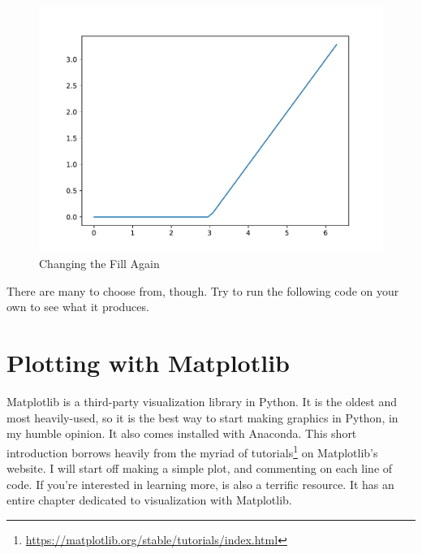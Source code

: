 \documentclass[
  12pt,
  krantz2]{krantz}
\makeatletter
\newenvironment{Shaded}{\begin{snugshade}}{\end{snugshade}}
\newcommand{\AttributeTok}[1]{\textcolor[rgb]{0.61,0.61,0.61}{#1}}
\newcommand{\DecValTok}[1]{\textcolor[rgb]{0.06,0.06,0.06}{#1}}
\newcommand{\FunctionTok}[1]{\textcolor[rgb]{0,0,0}{#1}}
\newcommand{\NormalTok}[1]{#1}
\newcommand{\OtherTok}[1]{\textcolor[rgb]{0.37,0.37,0.37}{#1}}
\newcommand{\SpecialCharTok}[1]{\textcolor[rgb]{0,0,0}{#1}}
\renewcommand{\href}[2]{#2\footnote{\url{#1}}}
\newenvironment{kframe}{%
\medskip{}
\setlength{\fboxsep}{.8em}
 \def\at@end@of@kframe{}%
 \ifinner\ifhmode%
  \def\at@end@of@kframe{\end{minipage}}%
  \begin{minipage}{\columnwidth}%
 \fi\fi%
 \def\FrameCommand##1{\hskip\@totalleftmargin \hskip-\fboxsep
 \colorbox{shadecolor}{##1}\hskip-\fboxsep
     \hskip-\linewidth \hskip-\@totalleftmargin \hskip\columnwidth}%
 \MakeFramed {\advance\hsize-\width
   \@totalleftmargin\z@ \linewidth\hsize
   \@setminipage}}%
 {\par\unskip\endMakeFramed%
 \at@end@of@kframe}
\renewenvironment{Shaded}{\begin{kframe}}{\end{kframe}}
\makeatother
\begin{document}
\begin{figure}
\centering
\includegraphics{r_and_python_book_files/figure-latex/unnamed-chunk-227-1.pdf}
\caption{\label{fig:unnamed-chunk-227}Changing the Fill Again}
\end{figure}

There are many to choose from, though. Try to run the following code on your own to see what it produces.

\begin{Shaded}
\end{Shaded}

\hypertarget{plotting-with-matplotlib}{%
\section{Plotting with Matplotlib}\label{plotting-with-matplotlib}}

Matplotlib \citep{Hunter:2007} is a third-party visualization library in Python. It is the oldest and most heavily-used, so it is the best way to start making graphics in Python, in my humble opinion. It also comes installed with Anaconda. This short introduction borrows heavily from the myriad of \href{https://matplotlib.org/stable/tutorials/index.html}{tutorials} on Matplotlib's website. I will start off making a simple plot, and commenting on each line of code. If you're interested in learning more, \citep{py_ds_handbook} is also a terrific resource. It has an entire chapter dedicated to visualization with Matplotlib.
\end{document}
